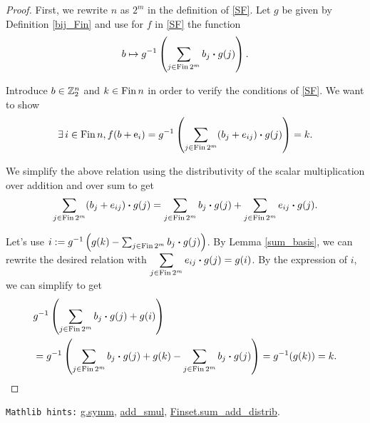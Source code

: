 \begin{proof}
\leanok
First, we {\B rewrite} $n$ as $2^m$ in the definition of \eqref{SF}. {\B Let} $g$ be given by {\B Definition} \ref{bij_Fin} and {\B use} for $f$ in \eqref{SF} the function
$$b\mapsto g^{-1}\left(\sum_{j\in\mathrm{Fin}\, 2^m} b_j \boldsymbol{\cdot} g(j)\right).$$

{\B Introduce} $b\in\mathbb{Z}_2^n$ and $k\in\mathrm{Fin}\, n$ in order to verify the conditions of \eqref{SF}. We want to show
$$\exists\,i\in\mathrm{Fin}\, n, f(b + {\rm e}_i) = g^{-1}\left(\sum_{j\in\mathrm{Fin}\, 2^m} (b_j + e_{ij}) \boldsymbol{\cdot} g(j)\right) = k.$$

We {\B simplify} the above relation using the {\B distributivity of the scalar multiplication over addition} and over {\B sum} to get
$$\sum_{j\in\mathrm{Fin}\, 2^m} (b_j + e_{ij}) \boldsymbol{\cdot} g(j) = \sum_{j\in\mathrm{Fin}\, 2^m} b_j \boldsymbol{\cdot} g(j) + \sum_{j\in\mathrm{Fin}\, 2^m} e_{ij} \boldsymbol{\cdot} g(j).$$

{\B Let}'s {\B use} $i := g^{-1}\left(g(k) - \sum_{j\in\mathrm{Fin}\, 2^m} b_j \boldsymbol{\cdot} g(j)\right)$.
By {\B Lemma \ref{sum_basis}}, we can {\B rewrite} the desired relation with $\displaystyle\sum_{j\in\mathrm{Fin}\, 2^m} e_{ij} \boldsymbol{\cdot} g(j) = g(i)$. By the expression of $i$, we can {\B simplify} to get
\begin{align*}
& g^{-1}\left(\sum_{j\in\mathrm{Fin}\, 2^m} b_j \boldsymbol{\cdot} g(j) + g(i)\right) \\
&= g^{-1}\left(\sum_{j\in\mathrm{Fin}\, 2^m} b_j \boldsymbol{\cdot} g(j) + g(k) - \sum_{j\in\mathrm{Fin}\, 2^m} b_j \boldsymbol{\cdot} g(j)\right) = g^{-1}(g(k)) = k.
\end{align*}
\end{proof}

\verb|Mathlib hints:| \href{https://leanprover-community.github.io/mathlib4_docs/Mathlib/Logic/Equiv/Defs.html#Equiv.symm}{g.symm}, \href{https://leanprover-community.github.io/mathlib4_docs/Mathlib/Algebra/Module/Defs.html#add_smul}{add\_smul}, \href{https://leanprover-community.github.io/mathlib4_docs/Mathlib/Algebra/BigOperators/Group/Finset/Basic.html#Finset.sum_add_distrib}{Finset.sum\_add\_distrib}.
